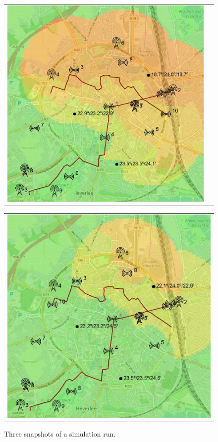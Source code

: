 \begin{figure}[h]
\begin{tabular}{ll}
         \includegraphics[scale=0.42]{figures/simACsnap2s.png}
    \end{tabular}
    \begin{tabular}{c}
         \includegraphics[scale=0.42]{figures/simACsnap3s.png} 
    \end{tabular}
    \caption{Three snapshots of a simulation run.}
    \label{fig:simAC}
\end{figure}
